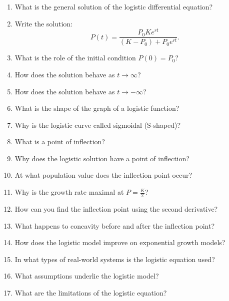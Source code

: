 \begin{enumerate}
\item What is the general solution of the logistic differential equation?

\item Write the solution:
  \[
    P(t)=\frac{P_0 K e^{rt}}{(K-P_0)+P_0 e^{rt}}.
  \]

\item What is the role of the initial condition $P(0)=P_0$?

\item How does the solution behave as $t \to \infty$?

\item How does the solution behave as $t \to -\infty$?

\item What is the shape of the graph of a logistic function?

\item Why is the logistic curve called sigmoidal (S-shaped)?

\item What is a point of inflection?

\item Why does the logistic solution have a point of inflection?

\item At what population value does the inflection point occur?

\item Why is the growth rate maximal at $P = \frac{K}{2}$?

\item How can you find the inflection point using the second derivative?

\item What happens to concavity before and after the inflection point?

\item How does the logistic model improve on exponential growth models?

\item In what types of real-world systems is the logistic equation used?

\item What assumptions underlie the logistic model?

\item What are the limitations of the logistic equation?

\end{enumerate}
